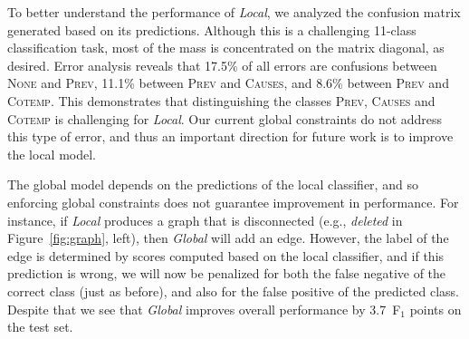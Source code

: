 To better understand the performance of \emph{Local}, we analyzed the confusion matrix generated based on its predictions. Although this is a challenging 11-class classification task, most of the mass is concentrated on the matrix diagonal, as desired. Error analysis reveals that 17.5\% of all errors are confusions between \textsc{None} and \textsc{Prev}, 11.1\% between \textsc{Prev} and \textsc{Causes}, and 8.6\% between \textsc{Prev} and \textsc{Cotemp}. This demonstrates that distinguishing the classes \textsc{Prev}, \textsc{Causes} and \textsc{Cotemp} is challenging for \emph{Local}. Our current global constraints do not address this type of error, and thus an important direction for future work is to improve the local model. 

The global model depends on the predictions of the local classifier, and so enforcing global constraints does not guarantee improvement in performance. For instance, if \emph{Local} produces a graph that is disconnected (e.g., \emph{deleted} in Figure~\ref{fig:graph}, left), then \emph{Global} will add an edge. However, the label of the edge is determined by scores computed based on the local classifier, and if this prediction is wrong, we will now be penalized for both the false negative of the correct class (just as before), and also for the false positive of the predicted class.  Despite that we see that \emph{Global} improves overall performance by 3.7~F$_{1}$ points on the test set.

